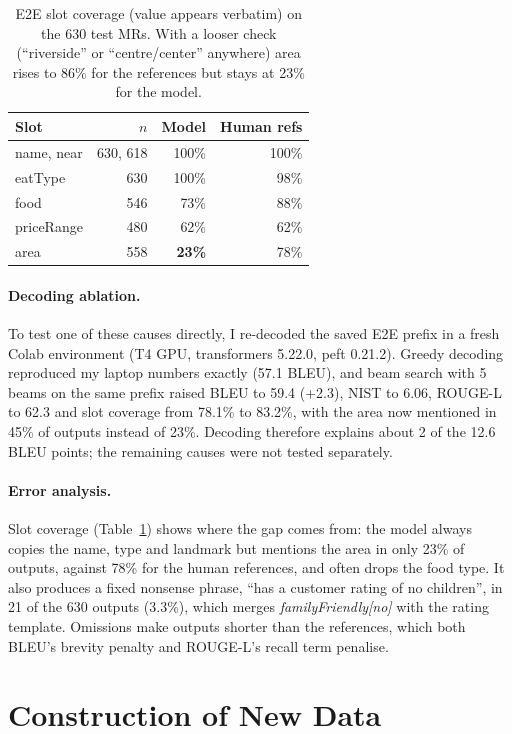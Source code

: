 \documentclass[11pt]{article}
\begin{document}
\begin{table}[t]
\centering\small
\begin{tabular}{@{}lrrr@{}}
\toprule
Slot & $n$ & Model & Human refs \\
\midrule
name, near & 630, 618 & 100\% & 100\% \\
eatType & 630 & 100\% & 98\% \\
food & 546 & 73\% & 88\% \\
priceRange & 480 & 62\% & 62\% \\
area & 558 & \textbf{23\%} & 78\% \\
\bottomrule
\end{tabular}
\caption{E2E slot coverage (value appears verbatim) on the 630 test MRs. With a looser check (``riverside'' or ``centre/center'' anywhere) area rises to 86\% for the references but stays at 23\% for the model.}
\label{tab:slots}
\end{table}

\paragraph{Decoding ablation.} To test one of these causes directly, I re-decoded the saved E2E prefix in a fresh Colab environment (T4 GPU, transformers 5.22.0, peft 0.21.2). Greedy decoding reproduced my laptop numbers exactly (57.1 BLEU), and beam search with 5 beams on the same prefix raised BLEU to 59.4 (+2.3), NIST to 6.06, ROUGE-L to 62.3 and slot coverage from 78.1\% to 83.2\%, with the area now mentioned in 45\% of outputs instead of 23\%. Decoding therefore explains about 2 of the 12.6 BLEU points; the remaining causes were not tested separately.

\paragraph{Error analysis.} Slot coverage (Table~\ref{tab:slots}) shows where the gap comes from: the model always copies the name, type and landmark but mentions the area in only 23\% of outputs, against 78\% for the human references, and often drops the food type. It also produces a fixed nonsense phrase, ``has a customer rating of no children'', in 21 of the 630 outputs (3.3\%), which merges \textit{familyFriendly[no]} with the rating template. Omissions make outputs shorter than the references, which both BLEU's brevity penalty and ROUGE-L's recall term penalise.

\section{Construction of New Data}
\end{document}
